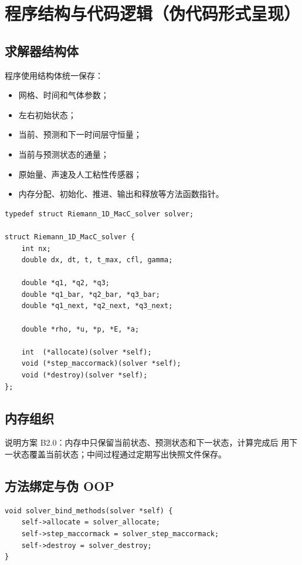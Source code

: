 \section{程序结构与代码逻辑（伪代码形式呈现）}

\subsection{求解器结构体}

程序使用结构体统一保存：

\begin{itemize}[leftmargin=2em]
    \item 网格、时间和气体参数；
    \item 左右初始状态；
    \item 当前、预测和下一时间层守恒量；
    \item 当前与预测状态的通量；
    \item 原始量、声速及人工粘性传感器；
    \item 内存分配、初始化、推进、输出和释放等方法函数指针。
\end{itemize}

\begin{lstlisting}[caption={求解器结构体示意}]
typedef struct Riemann_1D_MacC_solver solver;

struct Riemann_1D_MacC_solver {
    int nx;
    double dx, dt, t, t_max, cfl, gamma;

    double *q1, *q2, *q3;
    double *q1_bar, *q2_bar, *q3_bar;
    double *q1_next, *q2_next, *q3_next;

    double *rho, *u, *p, *E, *a;

    int  (*allocate)(solver *self);
    void (*step_maccormack)(solver *self);
    void (*destroy)(solver *self);
};
\end{lstlisting}

\subsection{内存组织}

说明方案 B2.0：内存中只保留当前状态、预测状态和下一状态，计算完成后
用下一状态覆盖当前状态；中间过程通过定期写出快照文件保存。

\subsection{方法绑定与伪 OOP}

\begin{lstlisting}[caption={方法函数绑定示意}]
void solver_bind_methods(solver *self) {
    self->allocate = solver_allocate;
    self->step_maccormack = solver_step_maccormack;
    self->destroy = solver_destroy;
}
\end{lstlisting}

